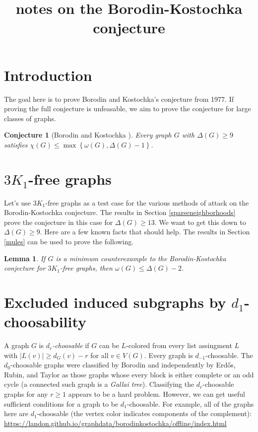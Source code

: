 \documentclass[12pt]{article}
\title{notes on the Borodin-Kostochka conjecture}
\author{}
\theoremstyle{plain}
\newtheorem{lem}[thm]{Lemma}
\newtheorem{conjecture}[thm]{Conjecture}
\theoremstyle{definition}
\theoremstyle{remark}
\newcommand{\set}[1]{\left\{ #1 \right\}}
\newcommand{\card}[1]{\left|#1\right|}
\begin{document}
\maketitle

\section{Introduction}
The goal here is to prove Borodin and Kostochka's conjecture from 1977.  If proving the full conjecture is unfeasable, we aim to prove the conjecture for large classes of graphs.
\begin{conjecture}[Borodin and Kostochka \cite{borodin1977upper}]
Every graph $G$ with $\Delta(G) \ge 9$ satisfies $\chi(G) \le \max\set{\omega(G), \Delta(G) - 1}$.
\end{conjecture}

\section{$3K_1$-free graphs}
Let's use $3K_1$-free graphs as a test case for the various methods of attack on the Borodin-Kostochka conjecture.  The results in Section \ref{sparseneighborhoods} prove the
conjecture in this case for $\Delta(G) \ge 13$.  We want to get this down to $\Delta(G) \ge 9$. Here are a few known facts that should help.  The results in Section \ref{mules}
can be used to prove the following.
\begin{lem}
If $G$ is a minimum counterexample to the Borodin-Kostochka conjecture for $3K_1$-free graphs, then $\omega(G) \le \Delta(G) - 2$.
\end{lem}



\section{Excluded induced subgraphs by $d_1$-choosability}\label{d1choosable}
A graph $G$ is \emph{$d_r$-choosable} if $G$ can be $L$-colored from every list assingment $L$ with $\card{L(v)} \ge d_G(v) - r$ for all $v \in V(G)$.
Every graph is $d_{-1}$-choosable.  
The $d_0$-choosable graphs were classified by Borodin \cite{borodin1977criterion} and independently by Erd\H{o}s, Rubin, and Taylor \cite{erdos1979choosability} as those
graphs whose every block is either complete or an odd cycle (a connected such graph is a \emph{Gallai tree}).  Classifying the $d_r$-choosable graphs for any $r \ge 1$ appears
to be a hard problem.  However, we can get useful sufficient conditions for a graph to be $d_1$-choosable.  For example, all of the graphs here are $d_1$-choosable (the vertex color indicates
components of the complement): \url{https://landon.github.io/graphdata/borodinkostochka/offline/index.html}
\end{document}
